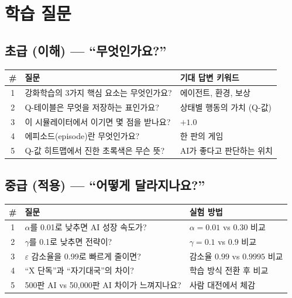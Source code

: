 \documentclass[11pt,a4paper]{article}
\begin{document}
\section{학습 질문}

\subsection{초급 (이해) — ``무엇인가요?''}

\begin{center}
\renewcommand{\arraystretch}{1.4}
\begin{tabular}{|c|p{7cm}|p{4cm}|}
\hline
\rowcolor{tableheader}
\textbf{\#} & \textbf{질문} & \textbf{기대 답변 키워드} \\
\hline
1 & 강화학습의 3가지 핵심 요소는 무엇인가요? & 에이전트, 환경, 보상 \\
\hline
2 & Q-테이블은 무엇을 저장하는 표인가요? & 상태별 행동의 가치 (Q-값) \\
\hline
3 & 이 시뮬레이터에서 이기면 몇 점을 받나요? & $+1.0$ \\
\hline
4 & 에피소드(episode)란 무엇인가요? & 한 판의 게임 \\
\hline
5 & Q-값 히트맵에서 진한 초록색은 무슨 뜻? & AI가 좋다고 판단하는 위치 \\
\hline
\end{tabular}
\end{center}

\subsection{중급 (적용) — ``어떻게 달라지나요?''}

\begin{center}
\renewcommand{\arraystretch}{1.4}
\begin{tabular}{|c|p{6cm}|p{5cm}|}
\hline
\rowcolor{tableheader}
\textbf{\#} & \textbf{질문} & \textbf{실험 방법} \\
\hline
1 & $\alpha$를 0.01로 낮추면 AI 성장 속도가? & $\alpha = 0.01$ vs $0.30$ 비교 \\
\hline
2 & $\gamma$를 0.1로 낮추면 전략이? & $\gamma = 0.1$ vs $0.9$ 비교 \\
\hline
3 & $\varepsilon$ 감소율을 0.99로 빠르게 줄이면? & 감소율 $0.99$ vs $0.9995$ 비교 \\
\hline
4 & ``X 단독''과 ``자기대국''의 차이? & 학습 방식 전환 후 비교 \\
\hline
5 & 500판 AI vs 50,000판 AI 차이가 느껴지나요? & 사람 대전에서 체감 \\
\hline
\end{tabular}
\end{center}
\end{document}
